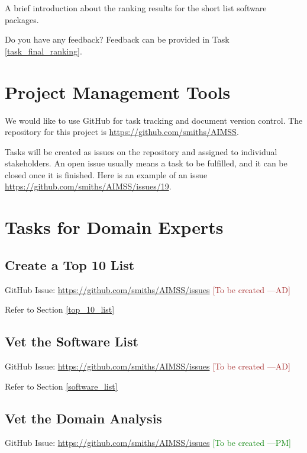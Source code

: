 \documentclass[12pt]{article}
\newcommand{\authornote}[3]{\textcolor{#1}{[#3 ---#2]}}
\newcommand{\authornote}[3]{}
\newcommand{\pmi}[1]{\authornote{green}{PM}{#1}} %
\newcommand{\ad}[1]{\authornote{brown}{AD}{#1}} %
\begin{document}
A brief introduction about the ranking results for the short list software packages.

Do you have any feedback? Feedback can be provided in Task \ref{task_final_ranking}.

\appendix
\section{Project Management Tools}
\label{proj_mgmt_tools}
We would like to use GitHub for task tracking and document version control. The
repository for this project is
\href{https://github.com/smiths/AIMSS}{https://github.com/smiths/AIMSS}.

Tasks will be created as issues on the repository and assigned to individual
stakeholders. An open issue usually means a task to be fulfilled, and it can be
closed once it is finished. Here is an example of an issue
\href{https://github.com/smiths/AIMSS/issues/19}{https://github.com/smiths/AIMSS/issues/19}.

\newpage

\section{Tasks for Domain Experts}
\label{tasks_domain_experts}

\subsection{Create a Top 10 List}
\label{task_top_10_list}
GitHub Issue:
\href{https://github.com/smiths/AIMSS/issues}{https://github.com/smiths/AIMSS/issues}
\ad{To be created}

\noindent Refer to Section \ref{top_10_list}

\subsection{Vet the Software List}
\label{task_software_list}
GitHub Issue:
\href{https://github.com/smiths/AIMSS/issues}{https://github.com/smiths/AIMSS/issues}
\ad{To be created}

\noindent Refer to Section \ref{software_list}

\subsection{Vet the Domain Analysis}
\label{task_domain_analysis}
GitHub Issue:
\href{https://github.com/smiths/AIMSS/issues}{https://github.com/smiths/AIMSS/issues}
\pmi{To be created}
\end{document}
